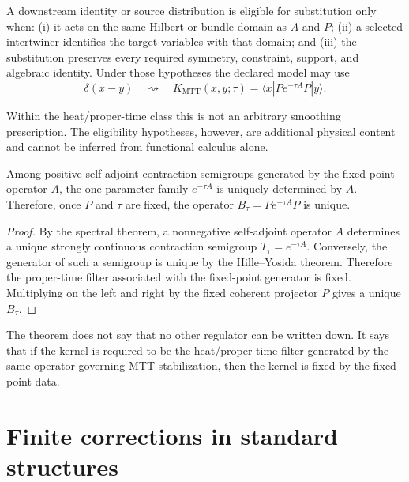 \documentclass[11pt]{article}
\begin{document}
\begin{definition}\label{def:replacement}
A downstream identity or source distribution is eligible for substitution
only when: (i) it acts on the same Hilbert or bundle domain as \(A\) and
\(P\); (ii) a selected intertwiner identifies the target variables with that
domain; and (iii) the substitution preserves every required symmetry,
constraint, support, and algebraic identity.  Under those hypotheses the
declared model may use
\[
        \delta(x-y)
        \quad\rightsquigarrow\quad
        K_{\mathrm{MTT}}(x,y;\tau)
        =
        \langle x|Pe^{-\tau A}P|y\rangle.
\]
\end{definition}

Within the heat/proper-time class this is not an arbitrary smoothing
prescription.  The eligibility hypotheses, however, are additional physical
content and cannot be inferred from functional calculus alone.

\begin{theorem}\label{thm:heatunique}
Among positive self-adjoint contraction semigroups generated by the fixed-point operator
\(A\), the one-parameter family \(e^{-\tau A}\) is uniquely determined by \(A\). Therefore,
once \(P\) and \(\tau\) are fixed, the operator \(B_\tau=Pe^{-\tau A}P\) is unique.
\end{theorem}

\begin{proof}
By the spectral theorem, a nonnegative self-adjoint operator \(A\) determines a unique
strongly continuous contraction semigroup \(T_\tau=e^{-\tau A}\). Conversely, the
generator of such a semigroup is unique by the Hille--Yosida theorem. Therefore the
proper-time filter associated with the fixed-point generator is fixed. Multiplying on the
left and right by the fixed coherent projector \(P\) gives a unique \(B_\tau\).
\end{proof}

\begin{remark}
The theorem does not say that no other regulator can be written down. It says that if the
kernel is required to be the heat/proper-time filter generated by the same operator governing
MTT stabilization, then the kernel is fixed by the fixed-point data.
\end{remark}

\section{Finite corrections in standard structures}
\end{document}
